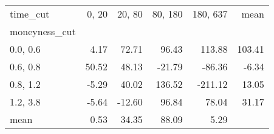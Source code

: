 \begin{tabular}{lrrrrr}
\toprule
time\_cut &  0, 20 &  20, 80 &  80, 180 &  180, 637 &   mean \\
moneyness\_cut &          &           &            &             &        \\
\midrule
0.0, 0.6    &     4.17 &     72.71 &      96.43 &      113.88 & 103.41 \\
0.6, 0.8    &    50.52 &     48.13 &     -21.79 &      -86.36 &  -6.34 \\
0.8, 1.2    &    -5.29 &     40.02 &     136.52 &     -211.12 &  13.05 \\
1.2, 3.8    &    -5.64 &    -12.60 &      96.84 &       78.04 &  31.17 \\
mean          &     0.53 &     34.35 &      88.09 &        5.29 &        \\
\bottomrule
\end{tabular}
